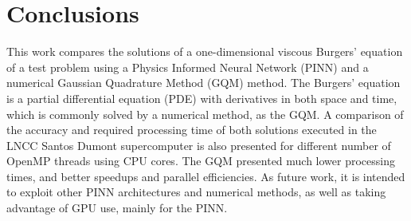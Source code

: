 \documentclass[conference]{IEEEtran}
\begin{document}
%
\section{Conclusions}\label{sec:conc}
%
This work compares the solutions of a one-dimensional viscous Burgers’ equation of a test problem using a Physics Informed Neural Network (PINN) and a numerical Gaussian Quadrature Method (GQM) method. The Burgers' equation is a partial differential equation (PDE) with derivatives in both space and time, which is commonly solved by a numerical method, as the GQM. A comparison of the accuracy and required processing time of both solutions executed in the LNCC Santos Dumont supercomputer is also presented for different number of OpenMP threads using CPU cores. The GQM presented much lower processing times, and better speedups and parallel efficiencies. As future work, it is intended to exploit other PINN architectures and numerical methods, as well as taking advantage of GPU use, mainly for the PINN.

%
\FloatBarrier


%
\end{document}

